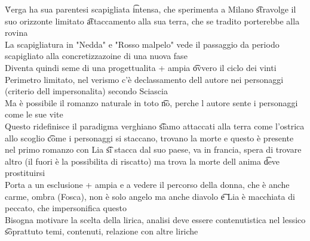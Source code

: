 \documentclass[12pt]{article}
\begin{document}
\v

Verga ha sua parentesi scapigliata \t intensa, che sperimenta a Milano \t stravolge il suo orizzonte limitato \t attaccamento alla sua terra, che se tradito porterebbe alla rovina \\
La scapigliatura in "Nedda" e "Rosso malpelo" vede il passaggio da periodo scapigliato alla concretizzazoine di una nuova fase \\
Diventa quindi seme di una progettualita + ampia \t ovvero il ciclo dei vinti \\
Perimetro limitato, nel verismo c'è declassamento dell autore nei personaggi (criterio dell impersonalita) secondo Sciascia \\
Ma è possibile il romanzo naturale in toto \t no, perche l autore sente i personaggi come le sue vite \\
Questo ridefinisce il paradigma verghiano \t siamo attaccati alla terra come l'ostrica allo scoglio \t come i personaggi si staccano, trovano la morte e questo è presente nel primo romanzo con Lia \t si stacca dal suo paese, va in francia, spera di trovare altro (il fuori è la possibilita di riscatto) ma trova la morte dell anima \t deve prostituirsi \\
Porta a un esclusione + ampia e a vedere il percorso della donna, che è anche carme, ombra (Fosca), non è solo angelo ma anche diavolo \t e Lia è macchiata di peccato, che impersonifica questo \\
Bisogna motivare la scelta della lirica, analisi deve essere contenutistica nel lessico \t soprattuto temi, contenuti, relazione con altre liriche
\end{document}
